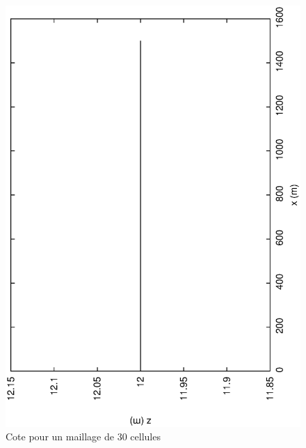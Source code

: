 \documentclass[a4paper,10pt]{article}
\begin{document}
\begin{figure}
 \begin{center}
  \includegraphics[angle=270,width=15cm]{Z50.eps}
  \caption{Cote pour un maillage de 30 cellules}
  \label{fig6}
 \end{center}
\end{figure}


%
%
\end{document}
